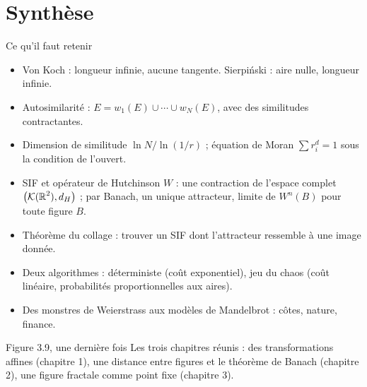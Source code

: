 \section{Synthèse}

\begin{frame}{Ce qu'il faut retenir}
  \small
  \begin{itemize}
    \item Von Koch : longueur infinie, aucune tangente. Sierpiński : aire
      nulle, longueur infinie.
    \item Autosimilarité : $E = w_1(E)\cup\cdots\cup w_N(E)$, avec des
      similitudes contractantes.
    \item Dimension de similitude $\ln N/\ln(1/r)$ ; équation de Moran
      $\sum r_i^d=1$ sous la condition de l'ouvert.
    \item SIF et opérateur de Hutchinson $W$ : une contraction de
      l'espace complet $\big(\mathcal{K}(\operatorname{\mathbb{R}}^2),d_H\big)$ ; par Banach, un
      unique attracteur, limite de $W^n(B)$ pour toute figure $B$.
    \item Théorème du collage : trouver un SIF dont l'attracteur
      ressemble à une image donnée.
    \item Deux algorithmes : déterministe (coût exponentiel), jeu du
      chaos (coût linéaire, probabilités proportionnelles aux aires).
    \item Des monstres de Weierstrass aux modèles de Mandelbrot : côtes,
      nature, finance.
  \end{itemize}
\end{frame}

\begin{frame}{Figure 3.9, une dernière fois}
  \small Les trois chapitres réunis : des transformations affines
  (chapitre 1), une distance entre figures et le théorème de Banach
  (chapitre 2), une figure fractale comme point fixe (chapitre 3).
\end{frame}

